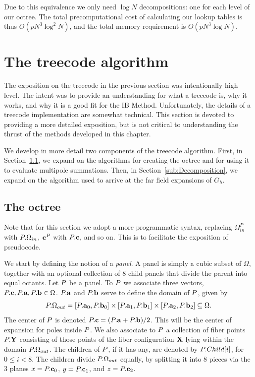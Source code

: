 Due to this equivalence we only need $\log N$ decompositions: one for each level of our octree.
The total precomputational cost of calculating our lookup tables is thus $O(pN^3\log^2 N)$, and the total memory requirement is $O(pN^3\log N)$.




\section{The treecode algorithm}
\label{Sec:TreecodeDetails}
The exposition on the treecode in the previous section was intentionally high level. The intent was to provide an understanding for what a treecode is, why it works, and why it is a good fit for the IB Method. Unfortunately, the details of a treecode implementation are somewhat technical. This section is devoted to providing a more detailed exposition, but is not critical to understanding the thrust of the methods developed in this chapter.

We develop in more detail two components of the treecode algorithm. First, in Section~\ref{sub:octree}, we expand on the algorithms for creating the octree and for using it to evaluate multipole summations. Then, in Section~\ref{sub:Decomposition}, we expand on the algorithm used to arrive at the far field expansions of $G_h$.

\subsection{The octree}
\label{sub:octree}
Note that for this section we adopt a more programmatic syntax, replacing $\Omega_{in}^P$ with $P.\Omega_{in}$, $\mathbf{c}^P$ with $P.\mathbf{c}$, and so on. This is to facilitate the exposition of pseudocode.

We start by defining the notion of a \textit{panel}. A panel is simply a cubic subset of $\Omega$, together with an optional collection of 8 child panels that divide the parent into equal octants. Let $P$ be a panel. To $P$ we associate three vectors, $P.\mathbf{c}, P.\mathbf{a}, P.\mathbf{b} \in\Omega$. $P.\mathbf{a}$ and $P.\mathbf{b}$ serve to define the domain of $P$, given by
\begin{equation}
P.\Omega_{out} = 
[P.\mathbf{a}_0, P.\mathbf{b}_0]\times
[P.\mathbf{a}_1, P.\mathbf{b}_1]\times
[P.\mathbf{a}_2, P.\mathbf{b}_2] \subseteq \Omega.
\end{equation}
The center of $P$ is denoted $P.\mathbf{c} = (P.\mathbf{a} + P.\mathbf{b}) / 2$. This will be the center of expansion for poles inside $P$. We also associate to $P$ a collection of fiber points $P.\mathbf{Y}$ consisting of those points of the fiber configuration $\mathbf{X}$ lying within the domain $P.\Omega_{out}$. The children of $P$, if it has any, are denoted by $P.Child[i]$, for $0\leq i<8$. The children divide $P.\Omega_{out}$ equally, by splitting it into $8$ pieces via the 3 planes $x=P.\mathbf{c}_0$, $y=P.\mathbf{c}_1$, and $z=P.\mathbf{c}_2$.

